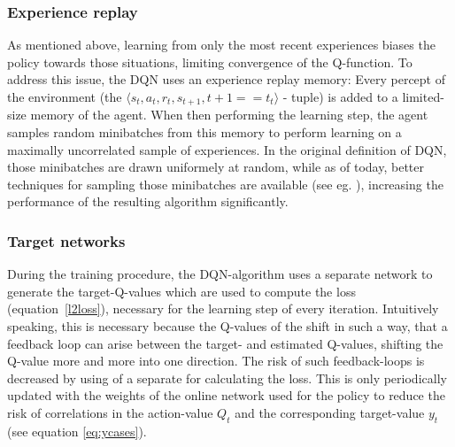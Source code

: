 \subsubsection*{Experience replay}
As mentioned above, learning from only the most recent experiences biases the policy towards those situations, limiting convergence of the Q-function. To address this issue, the DQN uses an experience replay memory: Every percept of the environment (the $\langle s_t, a_t, r_t, s_{t+1}, t+1==t_t \rangle$ - tuple) is added to a limited-size memory of the agent. When then performing the learning step, the agent samples random minibatches from this memory to perform learning on a maximally uncorrelated sample of experiences. In the original definition of DQN, those minibatches are drawn uniformely at random, while as of today, better techniques for sampling those minibatches are available (see eg. \cite{schaul_prioritized_2015}), increasing the performance of the resulting algorithm significantly. %

\subsubsection*{Target networks}
During the training procedure, the DQN-algorithm uses a separate network to generate the target-Q-values which are used to compute the loss (equation~\ref{l2loss}), necessary for the learning step of every iteration. Intuitively speaking, this is necessary because the Q-values of the  shift in such a way, that a feedback loop can arise between the target- and estimated Q-values, shifting the Q-value more and more into one direction. %
The risk of such feedback-loops is decreased by using of a separate  for calculating the loss. This is only periodically updated with the weights of the online network used for the policy to reduce the risk of correlations in the action-value $Q_t$ and the corresponding target-value $y_t$ (see equation \ref{eq:ycases}).\\

